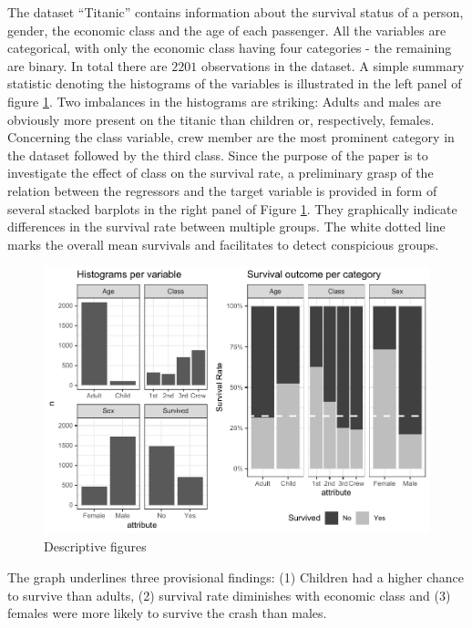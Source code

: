 \documentclass[
]{article}
\begin{document}
The dataset ``Titanic'' contains information about the survival status
of a person, gender, the economic class and the age of each passenger.
All the variables are categorical, with only the economic class having
four categories - the remaining are binary. In total there are \(2201\)
observations in the dataset. A simple summary statistic denoting the
histograms of the variables is illustrated in the left panel of figure
\ref{fig:categories}. Two imbalances in the histograms are striking:
Adults and males are obviously more present on the titanic than children
or, respectively, females. Concerning the class variable, crew member
are the most prominent category in the dataset followed by the third
class. Since the purpose of the paper is to investigate the effect of
class on the survival rate, a preliminary grasp of the relation between
the regressors and the target variable is provided in form of several
stacked barplots in the right panel of Figure \ref{fig:categories}. They
graphically indicate differences in the survival rate between multiple
groups. The white dotted line marks the overall mean survivals and
facilitates to detect conspicious groups.

\begin{figure}[h]

{\centering \includegraphics{Project-5_files/figure-latex/categories-1} 

}

\caption{Descriptive figures}\label{fig:categories}
\end{figure}

The graph underlines three provisional findings: (1) Children had a
higher chance to survive than adults, (2) survival rate diminishes with
economic class and (3) females were more likely to survive the crash
than males.
\end{document}
